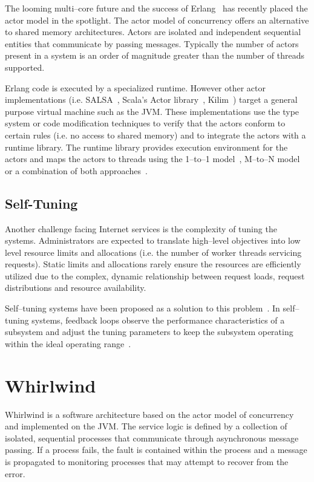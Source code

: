 \documentclass[conference,a4paper,final]{IEEEtran}
\begin{document}
The looming multi--core future and the success of Erlang~\cite{armstrong96erlang} has recently placed the actor model in the spotlight. The actor model of concurrency offers an alternative to shared memory architectures. Actors are isolated and independent sequential entities that communicate by passing messages. Typically the number of actors present in a system is an order of magnitude greater than the number of threads supported.

Erlang code is executed by a specialized runtime. However other actor implementations (i.e. SALSA~\cite{Varela:SALSA}, Scala's Actor library~\cite{Haller:07:ScalaActors}, Kilim~\cite{Srinivasan:08:Kilim}) target a general purpose virtual machine such as the JVM. These implementations use the type system or code modification techniques to verify that the actors conform to certain rules (i.e. no access to shared memory) and to integrate the actors with a runtime library. The runtime library provides execution environment for the actors and maps the actors to threads using the 1--to--1 model~\cite{Varela:SALSA}, M--to--N model~\cite{Srinivasan:08:Kilim,armstrong96erlang} or a combination of both approaches~\cite{Haller:07:ScalaActors}.

\subsection{Self-Tuning}

Another challenge facing Internet services is the complexity of tuning the systems. Administrators are expected to translate high--level objectives into low level resource limits and allocations (i.e. the number of worker threads servicing requests). Static limits and allocations rarely ensure the resources are efficiently utilized due to the complex, dynamic relationship between request loads, request distributions and resource availability. 

Self--tuning systems have been proposed as a solution to this problem~\cite{Kephart03AutonomicVision}. In self--tuning systems, feedback loops observe the performance characteristics of a subsystem and adjust the tuning parameters to keep the subsystem operating within the ideal operating range~\cite{welsh03Adaptive,Heiss:91:AdaptiveLoadControl}.

\section{Whirlwind}

Whirlwind is a software architecture based on the actor model of concurrency and implemented on the JVM. The service logic is defined by a collection of isolated, sequential processes that communicate through asynchronous message passing. If a process fails, the fault is contained within the process and a message is propagated to monitoring processes that may attempt to recover from the error.
\end{document}

